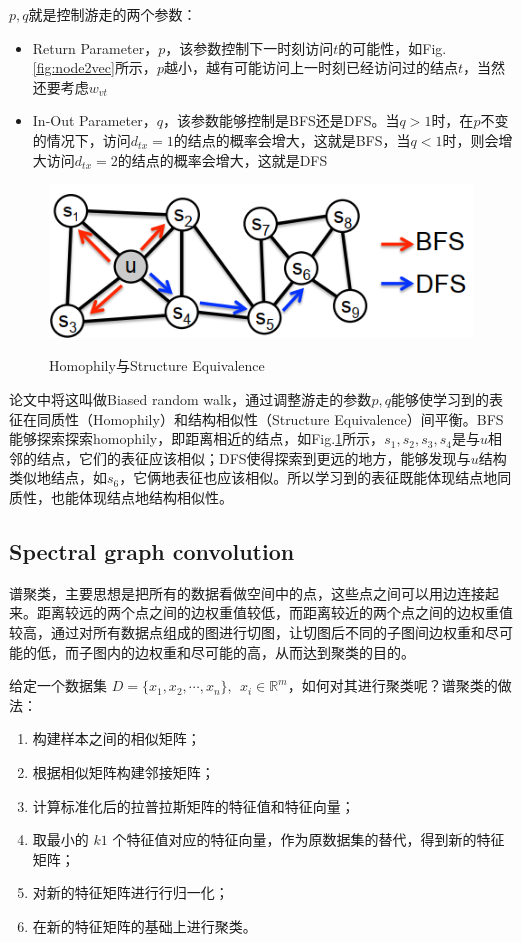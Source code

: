 $p, q$就是控制游走的两个参数：
\begin{itemize}
	\item Return Parameter，$p$，该参数控制下一时刻访问$t$的可能性，如Fig.\ref{fig:node2vec}所示，$p$越小，越有可能访问上一时刻已经访问过的结点$t$，当然还要考虑$w_{vt}$
	\item In-Out Parameter，$q$，该参数能够控制是BFS还是DFS。当$q>1$时，在$p$不变的情况下，访问$d_{tx} = 1$的结点的概率会增大，这就是BFS，当$q<1$时，则会增大访问$d_{tx} = 2$的结点的概率会增大，这就是DFS
\end{itemize}
\begin{figure}[h]
	\centering
	\includegraphics[width=.8\textwidth]{pics/node2vec2.png}
	\label{fig:node2vec2}
	\caption{Homophily与Structure Equivalence}
\end{figure}

论文中将这叫做Biased random walk，通过调整游走的参数$p,q$能够使学习到的表征在同质性（Homophily）和结构相似性（Structure Equivalence）间平衡。BFS能够探索探索homophily，即距离相近的结点，如Fig.\ref{fig:node2vec2}所示，$s_1, s_2, s_3, s_4$是与$u$相邻的结点，它们的表征应该相似；DFS使得探索到更远的地方，能够发现与$u$结构类似地结点，如$s_6$，它俩地表征也应该相似。所以学习到的表征既能体现结点地同质性，也能体现结点地结构相似性。

\subsection{Spectral graph convolution}
谱聚类，主要思想是把所有的数据看做空间中的点，这些点之间可以用边连接起来。距离较远的两个点之间的边权重值较低，而距离较近的两个点之间的边权重值较高，通过对所有数据点组成的图进行切图，让切图后不同的子图间边权重和尽可能的低，而子图内的边权重和尽可能的高，从而达到聚类的目的。

给定一个数据集 $D = \{x_1, x_2, \cdots, x_n\},\ \ x_i \in \mathbb{R}^m$，如何对其进行聚类呢？谱聚类的做法：
\begin{enumerate}
	\item 构建样本之间的相似矩阵；
	\item 根据相似矩阵构建邻接矩阵；
	\item 计算标准化后的拉普拉斯矩阵的特征值和特征向量；
	\item 取最小的 $k1$ 个特征值对应的特征向量，作为原数据集的替代，得到新的特征矩阵；
	\item 对新的特征矩阵进行行归一化；
	\item 在新的特征矩阵的基础上进行聚类。
\end{enumerate}